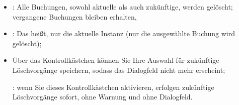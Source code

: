 \begin{enumerate}
\begin{figure}[htbp]
		\label{planned-transactions-delete-img}
	\end{figure}
	\begin{itemize}
		\item {}: Alle Buchungen, sowohl aktuelle als auch zukünftige, werden gelöscht; vergangene Buchungen bleiben erhalten,
		\item {}: Das heißt, nur die aktuelle Instanz (nur die ausgewählte Buchung wird gelöscht);
		\item Über das Kontrollkästchen  können Sie Ihre Auswahl für zukünftige Löschvorgänge speichern, sodass das Dialogfeld nicht mehr erscheint;
		
		\Attention{}: wenn Sie dieses Kontrollkästchen aktivieren, erfolgen zukünftige Löschvorgänge sofort, ohne Warnung und ohne Dialogfeld.
		

\end{itemize}
\end{enumerate}
